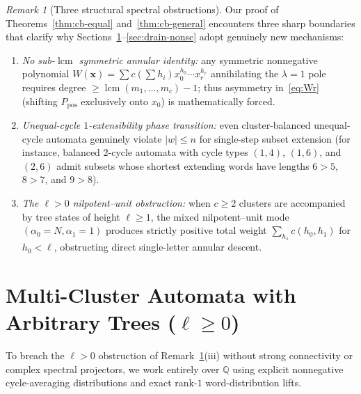 \documentclass[11pt,a4paper]{article}
\theoremstyle{definition}
\theoremstyle{remark}
\newtheorem{remark}[theorem]{Remark}
\newcommand{\lcm}{\operatorname{lcm}}
\newcommand{\Q}{\mathbb{Q}}
\begin{document}
\begin{remark}[Three structural spectral obstructions]
\label{rem:obstructions}
Our proof of Theorems~\ref{thm:cb-equal} and~\ref{thm:cb-general} encounters three sharp boundaries that clarify why Sections~\ref{sec:trees}--\ref{sec:drain-nonsc} adopt genuinely new mechanisms:
\begin{enumerate}[label=(\roman*),nosep]
  \item \emph{No sub-$\lcm$ symmetric annular identity:} any symmetric nonnegative polynomial $W(\mathbf{x}) = \sum c(\sum h_i) x_0^{h_0} \cdots x_r^{h_r}$ annihilating the $\lambda = 1$ pole requires degree $\ge \lcm(m_1, \dots, m_c) - 1$; thus asymmetry in~\eqref{eq:Wr} (shifting $P_{\mathrm{pos}}$ exclusively onto $x_0$) is mathematically forced.
  \item \emph{Unequal-cycle $1$-extensibility phase transition:} even cluster-balanced unequal-cycle automata genuinely violate $|w| \le n$ for single-step subset extension (for instance, balanced $2$-cycle automata with cycle types $(1,4)$, $(1,6)$, and $(2,6)$ admit subsets whose shortest extending words have lengths $6 > 5$, $8 > 7$, and $9 > 8$).
  \item \emph{The $\ell > 0$ nilpotent--unit obstruction:} when $c \ge 2$ clusters are accompanied by tree states of height $\ell \ge 1$, the mixed nilpotent--unit mode $(\alpha_0 = N, \alpha_1 = 1)$ produces strictly positive total weight $\sum_{h_1} c(h_0, h_1)$ for $h_0 < \ell$, obstructing direct single-letter annular descent.
\end{enumerate}
\end{remark}

\section{Multi-Cluster Automata with Arbitrary Trees \texorpdfstring{($\ell \ge 0$)}{(l >= 0)}}
\label{sec:trees}

To breach the $\ell > 0$ obstruction of Remark~\ref{rem:obstructions}(iii) without strong connectivity or complex spectral projectors, we work entirely over $\Q$ using explicit nonnegative cycle-averaging distributions and exact rank-$1$ word-distribution lifts.
\end{document}
